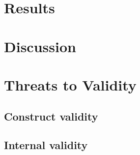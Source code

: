 \documentclass[10pt,conference]{IEEEtran}
\begin{document}

\section{Results}
\label{sec:results}


\section{Discussion}
\label{sec:discussion}


\section{Threats to Validity}
\label{sec:ttv}


\subsection*{Construct validity}

\subsection*{Internal validity}
\end{document}
